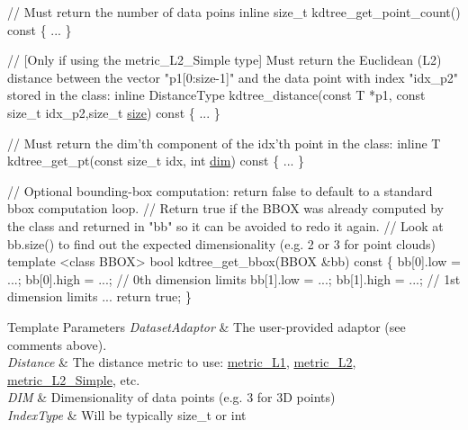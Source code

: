 \begin{DoxyCode}
      \textcolor{comment}{// Must return the number of data poins}
      \textcolor{keyword}{inline} \textcolor{keywordtype}{size\_t} kdtree\_get\_point\_count()\textcolor{keyword}{ const }\{ ... \}
   
      \textcolor{comment}{// [Only if using the metric\_L2\_Simple type] Must return the Euclidean (L2) distance between the}
vector \textcolor{stringliteral}{"p1[0:size-1]"} and the data point with index \textcolor{stringliteral}{"idx\_p2"} stored in the \textcolor{keyword}{class}:
      \textcolor{keyword}{inline} DistanceType kdtree\_distance(\textcolor{keyword}{const} T *p1, \textcolor{keyword}{const} \textcolor{keywordtype}{size\_t} idx\_p2,\textcolor{keywordtype}{size\_t} 
      \hyperlink{classSph_1_1KDTreeSingleIndexAdaptor_a48c011ca89a6a97693b7ba78e112d32c}{size})\textcolor{keyword}{ const }\{ ... \}
   
      \textcolor{comment}{// Must return the dim'th component of the idx'th point in the class:}
      \textcolor{keyword}{inline} T kdtree\_get\_pt(\textcolor{keyword}{const} \textcolor{keywordtype}{size\_t} idx, \textcolor{keywordtype}{int} \hyperlink{classSph_1_1KDTreeSingleIndexAdaptor_a251cff804024c3de6cc015ac7628b9d5}{dim})\textcolor{keyword}{ const }\{ ... \}
   
      \textcolor{comment}{// Optional bounding-box computation: return false to default to a standard bbox computation loop.}
      \textcolor{comment}{//   Return true if the BBOX was already computed by the class and returned in "bb" so it can be}
avoided to redo it again.
      \textcolor{comment}{//   Look at bb.size() to find out the expected dimensionality (e.g. 2 or 3 for point clouds)}
      \textcolor{keyword}{template} <\textcolor{keyword}{class} BBOX>
      \textcolor{keywordtype}{bool} kdtree\_get\_bbox(BBOX &bb)\textcolor{keyword}{ const}
\textcolor{keyword}{      }\{
         bb[0].low = ...; bb[0].high = ...;  \textcolor{comment}{// 0th dimension limits}
         bb[1].low = ...; bb[1].high = ...;  \textcolor{comment}{// 1st dimension limits}
         ...
         \textcolor{keywordflow}{return} \textcolor{keyword}{true};
      \}
\end{DoxyCode}



\begin{DoxyTemplParams}{Template Parameters}
{\em Dataset\+Adaptor} & The user-\/provided adaptor (see comments above). \\
\hline
{\em Distance} & The distance metric to use\+: \hyperlink{structSph_1_1metric__L1}{metric\+\_\+\+L1}, \hyperlink{structSph_1_1metric__L2}{metric\+\_\+\+L2}, \hyperlink{structSph_1_1metric__L2__Simple}{metric\+\_\+\+L2\+\_\+\+Simple}, etc. \\
\hline
{\em D\+IM} & Dimensionality of data points (e.\+g. 3 for 3D points) \\
\hline
{\em Index\+Type} & Will be typically size\+\_\+t or int \\
\hline
\end{DoxyTemplParams}


